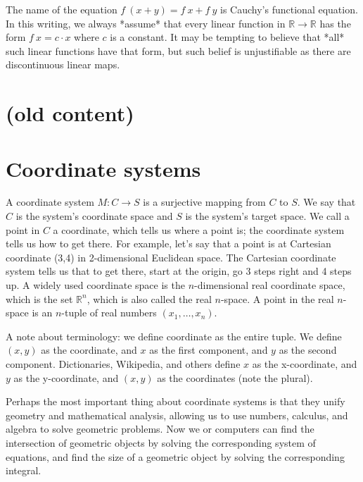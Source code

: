 The name of the equation $f~(x+y) = f~x + f~y$ is Cauchy's functional equation.
In this writing, we always *assume* that every linear function in $\mathbb{R} \to \mathbb{R}$
has the form $f~x = c \cdot x$ where $c$ is a constant.
It may be tempting to believe that *all* such linear functions have that form,
but such belief is unjustifiable as there are
discontinuous linear maps.

\section{(old content)}

\section{Coordinate systems}

A coordinate system $M : C \to S$ is a surjective mapping from $C$ to $S$.
We say that $C$ is the system's coordinate space and $S$ is the system's target space.
We call a point in $C$ a coordinate,
which tells us where a point is;
the coordinate system tells us how to get there.
For example, let's say that a point is at Cartesian coordinate (3,4) in 2-dimensional Euclidean space.
The Cartesian coordinate system tells us that to get there,
start at the origin, go 3 steps right and 4 steps up.
A widely used coordinate space is the
$n$-dimensional real coordinate space,
which is the set $\mathbb{R}^n$,
which is also called the real $n$-space.
A point in the real $n$-space is an $n$-tuple of real numbers $(x_1,\ldots,x_n)$.

A note about terminology:
we define coordinate as the entire tuple.
We define $(x,y)$ as the coordinate, and $x$ as the first component, and $y$ as the second component.
Dictionaries, Wikipedia, and others define $x$ as the x-coordinate, and $y$ as the y-coordinate,
and $(x,y)$ as the coordinates (note the plural).

Perhaps the most important thing about coordinate systems is that they unify geometry and
mathematical analysis,
allowing us to use numbers, calculus, and algebra to solve geometric problems.
Now we or computers can
find the intersection of geometric objects
by solving the corresponding system of equations,
and find the size of a geometric object by solving the corresponding integral.

